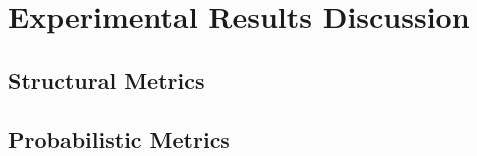 \section{Experimental Results Discussion}\label{subsec:results:main}


\subsection{Structural Metrics}\label{subsec:results:stuct_metrics}
\label{subsec:results:sp}

\subsection{Probabilistic Metrics}\label{subsec:results:prob_metrics}
\label{subsec:results:nr}

\label{subsec:results:epl}

\label{subsec:results:pp}

 




